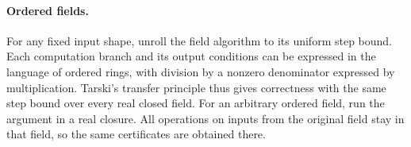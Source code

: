 \paragraph{Ordered fields.}
For any fixed input shape, unroll the field algorithm to its uniform
step bound. Each computation branch and its output conditions can
be expressed in the language of ordered rings, with division by a
nonzero denominator expressed by multiplication. Tarski's transfer
principle thus gives correctness with the same step bound over every
real closed field. For an arbitrary ordered field, run the argument in
a real closure. All operations on inputs from the original field stay
in that field, so the same certificates are obtained there.
